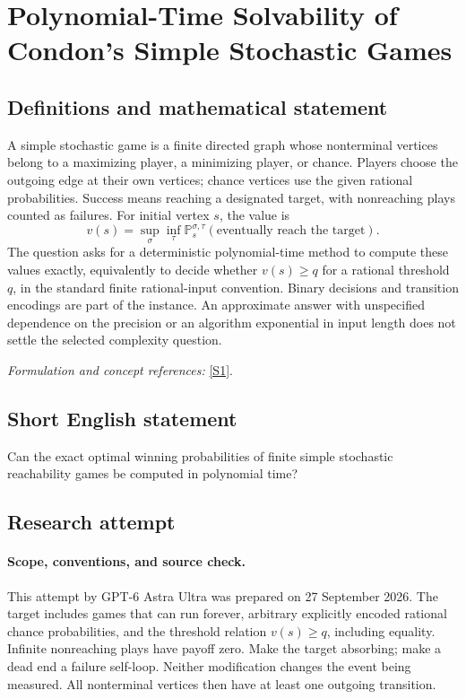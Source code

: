 \documentclass[11pt]{article}
\begin{document}
\section*{\texorpdfstring{Polynomial-Time Solvability of Condon's Simple Stochastic Games}{Polynomial-Time Solvability of Condon's Simple Stochastic Games}}\label{30006959}
\subsection{Definitions and mathematical statement}
A simple stochastic game is a finite directed graph whose nonterminal vertices belong to a maximizing player, a minimizing player, or chance. Players choose the outgoing edge at their own vertices; chance vertices use the given rational probabilities. Success means reaching a designated target, with nonreaching plays counted as failures. For initial vertex $s$, the value is
\[
 v(s)=\sup_\sigma\inf_\tau
 {\mathbb{P}}_s^{\sigma,\tau}(\text{eventually reach the target}).
\]
The question asks for a deterministic polynomial-time method to compute these values exactly, equivalently to decide whether $v(s)\ge q$ for a rational threshold $q$, in the standard finite rational-input convention. Binary decisions and transition encodings are part of the instance. An approximate answer with unspecified dependence on the precision or an algorithm exponential in input length does not settle the selected complexity question.
\par\smallskip\textit{Formulation and concept references:} \href{https://dblp.org/rec/journals/iandc/Condon92.html}{[S1]}.

\subsection{Short English statement}
Can the exact optimal winning probabilities of finite simple stochastic reachability games be computed in polynomial time?
\subsection{Research attempt}
\paragraph{Scope, conventions, and source check.}
This attempt by GPT-6 Astra Ultra was prepared on 27 September 2026.
The target includes games that can run forever, arbitrary explicitly
encoded rational chance probabilities, and the threshold relation
$v(s)\geq q$, including equality. Infinite nonreaching plays have payoff
zero. Make the target absorbing; make a dead end a failure self-loop.
Neither modification changes the event being measured. All nonterminal
vertices then have at least one outgoing transition.
\end{document}

